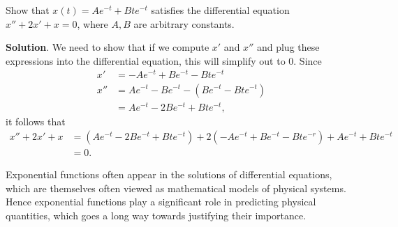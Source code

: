 \documentclass[10pt,]{book}
\theoremstyle{ptxplainnotitle}
\theoremstyle{ptxplaintitle}
\theoremstyle{ptxplainnotitle}
\theoremstyle{ptxplaintitle}
\theoremstyle{ptxplainnotitle}
\theoremstyle{ptxplaintitle}
\theoremstyle{ptxdefinitionnotitle}
\theoremstyle{ptxdefinitiontitle}
\theoremstyle{ptxdefinitionnotitle}
\theoremstyle{ptxdefinitiontitle}
\theoremstyle{ptxdefinitionnotitle}
\theoremstyle{ptxdefinitiontitle}
\theoremstyle{ptxdefinitionnotitle}
\theoremstyle{ptxdefinitiontitle}
\theoremstyle{ptxdefinitionnotitle}
\theoremstyle{ptxdefinitiontitle}
\numberwithin{equation}{section}
\begin{document}
\begin{example}\label{example-solutions-of-a-differential-equation}
\hypertarget{p-232}{}%
Show that \(x(t) = Ae^{-t} + Bte^{-t}\) satisfies the differential equation \(x'' + 2x' + x = 0\), where \(A,B\) are arbitrary constants.%
\par\smallskip%
\noindent\textbf{Solution}.\hypertarget{solution-50}{}\quad%
\hypertarget{p-233}{}%
We need to show that if we compute \(x'\) and \(x''\) and plug these expressions into the differential equation, this will simplify out to \(0\). Since%
\begin{align*}
x' & = -Ae^{-t} +Be^{-t} - Bte^{-t} \\
x'' & = Ae^{-t} - Be^{-t} - (Be^{-t} - Bte^{-t}) \\
& = Ae^{-t} - 2Be^{-t} + Bte^{-t}, 
\end{align*}
it follows that%
\begin{align*}
x'' + 2x' + x & = (Ae^{-t} - 2Be^{-t} + Bte^{-t}) + 2(-Ae^{-t} + Be^{-t} - Bte^{-r}) + Ae^{-t} + Bte^{-t} \\
& = 0. 
\end{align*}
%
\end{example}
\hypertarget{p-234}{}%
Exponential functions often appear in the solutions of differential equations, which are themselves often viewed as mathematical models of physical systems. Hence exponential functions play a significant role in predicting physical quantities, which goes a long way towards justifying their importance.%
\typeout{************************************************}
\typeout{************************************************}
\end{document}
